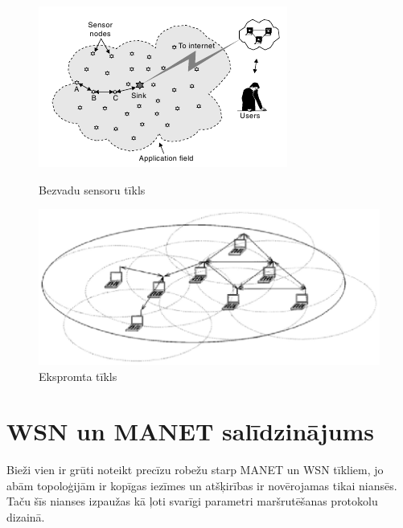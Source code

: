 \begin{figure}[!htb]
\begin{minipage}[t]{0.5\linewidth}
\centering
\includegraphics[scale=0.7]{./graph/wsn}
\caption{Bezvadu sensoru tīkls} \label{fig:wsn}
\end{minipage}%
\begin{minipage}[t]{0.5\linewidth}
\centering
\includegraphics[scale=0.6]{./graph/adhoc}
\caption{Ekspromta tīkls} \label{fig:manet}
\end{minipage}
\end{figure}

\section{WSN un MANET salīdzinājums}
Bieži vien ir grūti noteikt precīzu robežu starp MANET un WSN tīkliem, jo abām topoloģijām ir kopīgas iezīmes un atšķirības ir novērojamas tikai niansēs. Taču šīs nianses izpaužas kā ļoti  svarīgi parametri maršrutēšanas protokolu dizainā.

